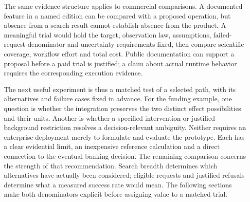The same evidence structure applies to commercial comparisons. A documented
feature in a named edition can be compared with a proposed operation, but
absence from a search result cannot establish absence from the product.
A meaningful trial would hold the target, observation law, assumptions,
failed-request denominator and uncertainty requirements fixed, then compare
scientific coverage, workflow effort and total cost. Public documentation
can support a proposal before a paid trial is justified; a claim about
actual runtime behavior requires the corresponding execution evidence.

The next useful experiment is thus a matched test of a selected path, with
its alternatives and failure cases fixed in advance. For the funding example,
one question is whether the integration preserves the two distinct effect
possibilities and their units. Another is whether a specified intervention
or justified background restriction resolves a decision-relevant ambiguity.
Neither requires an enterprise deployment merely to formulate and evaluate
the prototype. Each has a clear evidential limit, an inexpensive reference
calculation and a direct connection to the eventual banking decision.
The remaining comparison concerns the strength of that recommendation.
Search breadth determines which alternatives have actually been considered;
eligible requests and justified refusals determine what a measured success
rate would mean. The following sections make both denominators explicit
before assigning value to a matched trial.
\label{exec13:survey-end}
